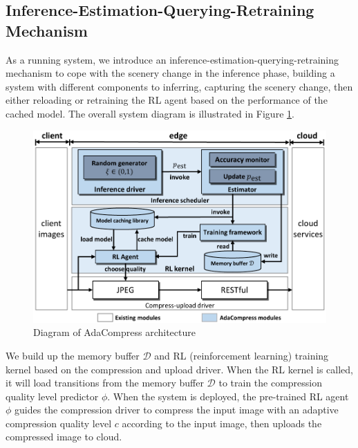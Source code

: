 \subsection{Inference-Estimation-Querying-Retraining Mechanism}

As a running system, we introduce an inference-estimation-querying-retraining mechanism to cope with the scenery change in the inference phase, building a system with different components to inferring, capturing the scenery change, then either reloading or retraining the RL agent based on the performance of the cached model. The overall system diagram is illustrated in Figure \ref{fig: diagram}.


\begin{figure}[htbp]
    \centerline{\includegraphics[width=0.8\linewidth]{figures/overall-diagram.pdf}}
    \vspace{0.2cm}
    \caption{Diagram of AdaCompress architecture}
    \label{fig: diagram}
\end{figure}

We build up the memory buffer $ \mathcal{D} $ and RL (reinforcement learning) training kernel based on the compression and upload driver. When the RL kernel is called, it will load transitions from the memory buffer $ \mathcal{D} $ to train the compression quality level predictor $ \phi $. When the system is deployed, the pre-trained RL agent $ \phi $ guides the compression driver to compress the input image with an adaptive compression quality level $ c $ according to the input image, then uploads the compressed image to cloud. %

